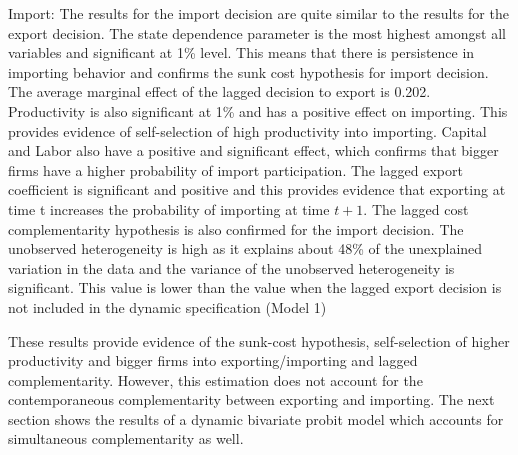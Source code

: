 \documentclass[11pt]{article}
\begin{document}
 Import:  The results for the import decision are quite similar to the
 results for the export decision. The state dependence parameter is the most highest
  amongst all variables and
  significant at 1\% level. This means that there is persistence in
  importing behavior and confirms the sunk cost hypothesis for import decision. The average marginal effect of the lagged
  decision to export is 0.202. Productivity is also significant at 1\%
  and has a 
  positive effect on importing. This provides evidence of
  self-selection of high productivity into importing. Capital and Labor
  also have a positive and significant effect, which confirms that
  bigger firms have a higher probability of import participation.  The lagged export coefficient is
  significant and positive and this provides evidence  that exporting
  at time t increases the probability of importing at time $t+1$. The
  lagged cost complementarity hypothesis is also confirmed for the
  import decision.  The
  unobserved heterogeneity is high as it explains about 48\% of the unexplained
  variation in the data and the variance of the unobserved
  heterogeneity is significant. This value is lower than the value
  when the lagged export decision is not included in the dynamic
  specification (Model 1) 

These results provide evidence of the sunk-cost hypothesis,
self-selection of higher productivity and bigger firms into
exporting/importing and lagged complementarity. However, this estimation does not
account for the contemporaneous  complementarity between exporting
and importing. The next section shows the results of a dynamic
bivariate probit model which accounts for simultaneous complementarity
as well. 


  
\end{document}
